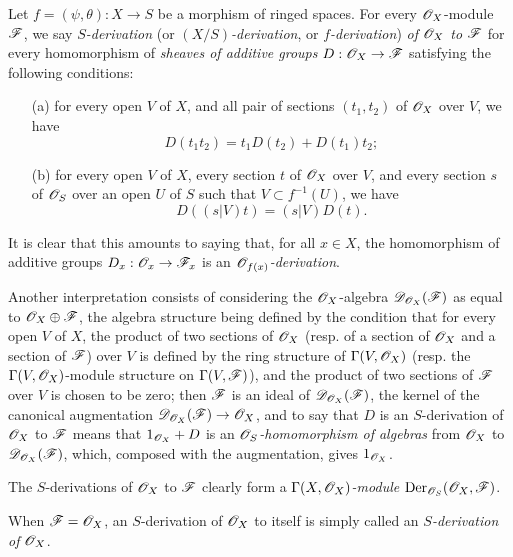 \begin{env}[16.5.1]
\label{IV.16.5.1}
Let $f = (\psi, \theta) : X \to S$ be a morphism of ringed spaces.
For every $\mathscr{O}_X$-module $\mathscr{F}$, we say \emph{$S$-derivation} (or \emph{$(X/S)$-derivation}, or \emph{$f$-derivation}) \emph{of $\mathscr{O}_X$ to $\mathscr{F}$} for every homomorphism of \emph{sheaves of additive groups} $D : \sh{O}_X \to \sh{F}$ satisfying the following conditions:
\begin{enumerate}
  \item[(a)] for every open $V$ of $X$, and all pair of sections $(t_1, t_2)$ of $\mathscr{O}_X$ over $V$, we have
  \[
  \label{IV.16.5.1.1}
    D(t_1 t_2) = t_1 D(t_2) + D(t_1)t_2;
    \tag{16.5.1.1}
  \]
  \item[(b)] for every open $V$ of $X$, every section $t$ of $\mathscr{O}_X$ over $V$, and every section $s$ of $\mathscr{O}_S$ over an open $U$ of $S$ such that $V \subset f^{-1}(U)$, we have
  \[
  \label{IV.16.5.1.2}
    D((s|V)t) = (s|V)D(t).
    \tag{16.5.1.2}
  \]
\end{enumerate}
It is clear that this amounts to saying that, for all $x \in X$, the homomorphism of additive groups $D_x : \sh{O}_x \to \sh{F}_x$ is an \emph{$\mathscr{O}_{f(x)}$-derivation}.

Another interpretation consists of considering the $\mathscr{O}_X$-algebra $\mathscr{D}_{\mathscr{O}_X}(\mathscr{F})$ as equal to $\mathscr{O}_X \oplus \mathscr{F}$, the algebra structure being defined by the condition that for every open $V$ of $X$, the product of two sections of $\mathscr{O}_X$ (resp. of a section of $\mathscr{O}_X$ and a section of $\mathscr{F}$) over $V$ is defined by the ring structure of $\Gamma(V, \mathscr{O}_X)$ (resp. the $\Gamma(V, \mathscr{O}_X)$-module structure on $\Gamma(V, \mathscr{F})$), and the product of two sections of $\mathscr{F}$ over $V$ is chosen to be zero;
then $\mathscr{F}$ is an ideal of $\mathscr{D}_{\mathscr{O}_X}(\mathscr{F})$, the kernel of the canonical augmentation $\sh{D}_{\sh{O}_X}(\sh{F}) \to \sh{O}_X$, and to say that $D$ is an $S$-derivation of $\mathscr{O}_X$ to $\mathscr{F}$ means that $1_{\mathscr{O}_X} + D$ is an \emph{$\mathscr{O}_S$-homomorphism of algebras} from $\mathscr{O}_X$ to $\mathscr{D}_{\mathscr{O}_X}(\mathscr{F})$, which, composed with the augmentation, gives $1_{\mathscr{O}_X}$.

The $S$-derivations of $\mathscr{O}_X$ to $\mathscr{F}$ clearly form a \emph{$\Gamma(X, \mathscr{O}_X)$-module} $\operatorname{Der}_{\mathscr{O}_S}(\mathscr{O}_X, \mathscr{F})$.

When $\mathscr{F} = \mathscr{O}_X$, an $S$-derivation of $\mathscr{O}_X$ to itself is simply called an \emph{$S$-derivation of $\mathscr{O}_X$}.
\end{env}

